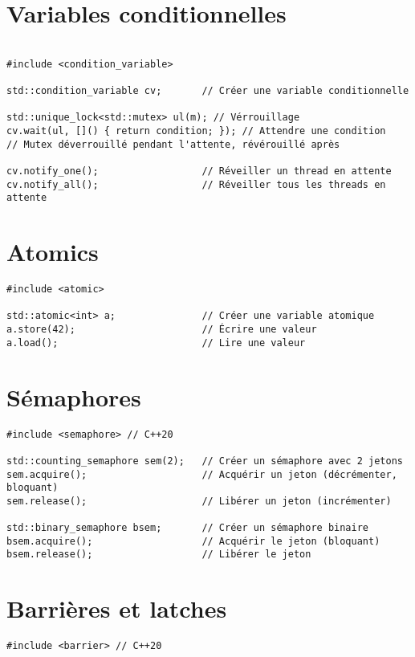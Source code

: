 \documentclass{article}
\begin{document}
\begin{multicols*}{3}
\section*{Variables conditionnelles}

\begin{lstlisting}

#include <condition_variable>

std::condition_variable cv;       // Créer une variable conditionnelle

std::unique_lock<std::mutex> ul(m); // Vérrouillage
cv.wait(ul, []() { return condition; }); // Attendre une condition
// Mutex déverrouillé pendant l'attente, révérouillé après

cv.notify_one();                  // Réveiller un thread en attente
cv.notify_all();                  // Réveiller tous les threads en attente

\end{lstlisting}

\section*{Atomics}

\begin{lstlisting}
#include <atomic>

std::atomic<int> a;               // Créer une variable atomique
a.store(42);                      // Écrire une valeur
a.load();                         // Lire une valeur
\end{lstlisting}
\section*{Sémaphores}

\begin{lstlisting}
#include <semaphore> // C++20

std::counting_semaphore sem(2);   // Créer un sémaphore avec 2 jetons
sem.acquire();                    // Acquérir un jeton (décrémenter, bloquant)
sem.release();                    // Libérer un jeton (incrémenter)

std::binary_semaphore bsem;       // Créer un sémaphore binaire
bsem.acquire();                   // Acquérir le jeton (bloquant)
bsem.release();                   // Libérer le jeton

\end{lstlisting}

\section*{Barrières et latches}
\begin{lstlisting}
#include <barrier> // C++20


\end{lstlisting}
\end{multicols*}
\end{document}
